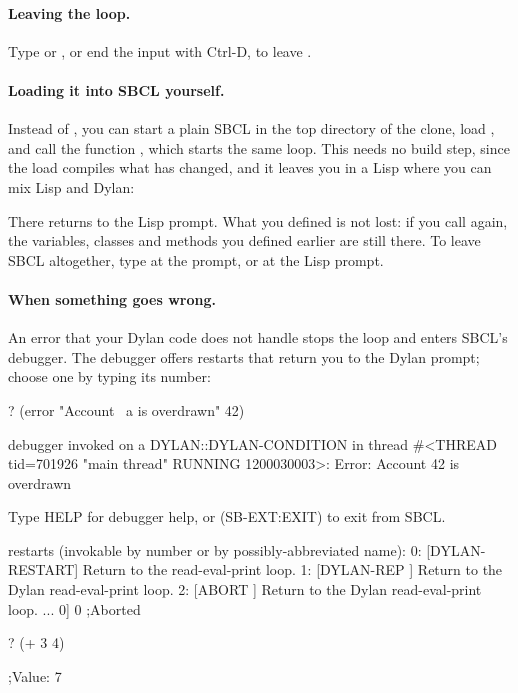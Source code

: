 \paragraph{Leaving the loop.} Type  or ,
or end the input with Ctrl-D, to leave .

\paragraph{Loading it into SBCL yourself.} 
Instead of , you can start a plain SBCL in the top directory
of the clone, load , and call the function
, which starts the same loop. This needs no build step,
since the load compiles what has changed, and it leaves you in a Lisp
where you can mix Lisp and Dylan:


\noindent
There  returns to the Lisp prompt. What you defined is
not lost: if you call  again, the variables, classes and
methods you defined earlier are still there. To leave SBCL altogether,
type  at the  prompt, or  at the
Lisp prompt.

\paragraph{When something goes wrong.} An error that your Dylan code does
not handle stops the loop and enters SBCL's debugger. The debugger
offers restarts that return you to the Dylan prompt; choose one by typing
its number:

\begin{repl}
? (error "Account ~a is overdrawn" 42)

debugger invoked on a DYLAN::DYLAN-CONDITION in thread
#<THREAD tid=701926 "main thread" RUNNING {1200030003}>:
  Error: Account 42 is overdrawn

Type HELP for debugger help, or (SB-EXT:EXIT) to exit from SBCL.

restarts (invokable by number or by possibly-abbreviated name):
  0: [DYLAN-RESTART] Return to the read-eval-print loop.
  1: [DYLAN-REP    ] Return to the Dylan read-eval-print loop.
  2: [ABORT        ] Return to the Dylan read-eval-print loop.
...
0] 0
;Aborted

? (+ 3 4)

;Value: 7
\end{repl}

